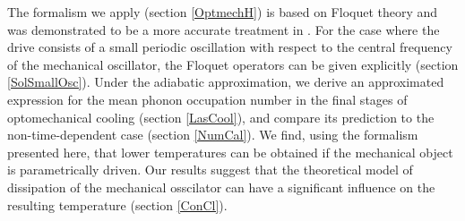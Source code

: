 \documentclass[reprint, amsmath,amssymb, aps,pra]{revtex4-1}
\begin{document}
The formalism we apply (section \ref{OptmechH}) is based on
Floquet theory and was demonstrated to be a more accurate treatment in
\cite{HanngiFM}. For the case where the drive consists of a small
periodic oscillation with respect to the central frequency of the
mechanical oscillator, the Floquet operators can be given explicitly
(section \ref{SolSmallOsc}). Under the adiabatic approximation, we
derive an approximated expression for the mean phonon occupation
number in the final stages of optomechanical cooling (section
\ref{LasCool}), and compare its prediction to the non-time-dependent
case (section \ref{NumCal}). We find, using the formalism presented
here, that lower temperatures can be obtained if the mechanical object
is parametrically driven. Our results suggest that the theoretical
model of dissipation of the mechanical osscilator can have a
significant influence on the resulting temperature (section
\ref{ConCl}).




\end{document}
